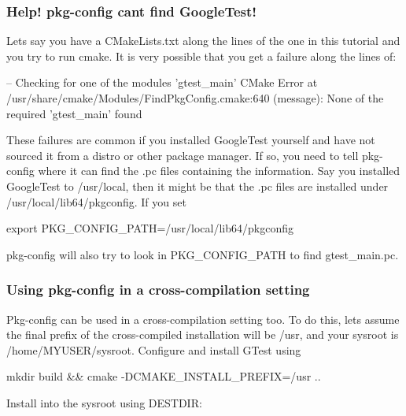 \subsubsection*{Help! pkg-\/config can\textquotesingle{}t find Google\+Test!}

Let\textquotesingle{}s say you have a {\ttfamily C\+Make\+Lists.\+txt} along the lines of the one in this tutorial and you try to run {\ttfamily cmake}. It is very possible that you get a failure along the lines of\+:


\begin{DoxyCode}
-- Checking for one of the modules 'gtest\_main'
CMake Error at /usr/share/cmake/Modules/FindPkgConfig.cmake:640 (message):
  None of the required 'gtest\_main' found
\end{DoxyCode}


These failures are common if you installed Google\+Test yourself and have not sourced it from a distro or other package manager. If so, you need to tell pkg-\/config where it can find the {\ttfamily .pc} files containing the information. Say you installed Google\+Test to {\ttfamily /usr/local}, then it might be that the {\ttfamily .pc} files are installed under {\ttfamily /usr/local/lib64/pkgconfig}. If you set


\begin{DoxyCode}
export PKG\_CONFIG\_PATH=/usr/local/lib64/pkgconfig
\end{DoxyCode}


pkg-\/config will also try to look in {\ttfamily P\+K\+G\+\_\+\+C\+O\+N\+F\+I\+G\+\_\+\+P\+A\+TH} to find {\ttfamily gtest\+\_\+main.\+pc}.

\subsubsection*{Using pkg-\/config in a cross-\/compilation setting}

Pkg-\/config can be used in a cross-\/compilation setting too. To do this, let\textquotesingle{}s assume the final prefix of the cross-\/compiled installation will be {\ttfamily /usr}, and your sysroot is {\ttfamily /home/\+M\+Y\+U\+S\+E\+R/sysroot}. Configure and install G\+Test using


\begin{DoxyCode}
mkdir build && cmake -DCMAKE\_INSTALL\_PREFIX=/usr ..
\end{DoxyCode}


Install into the sysroot using {\ttfamily D\+E\+S\+T\+D\+IR}\+:


